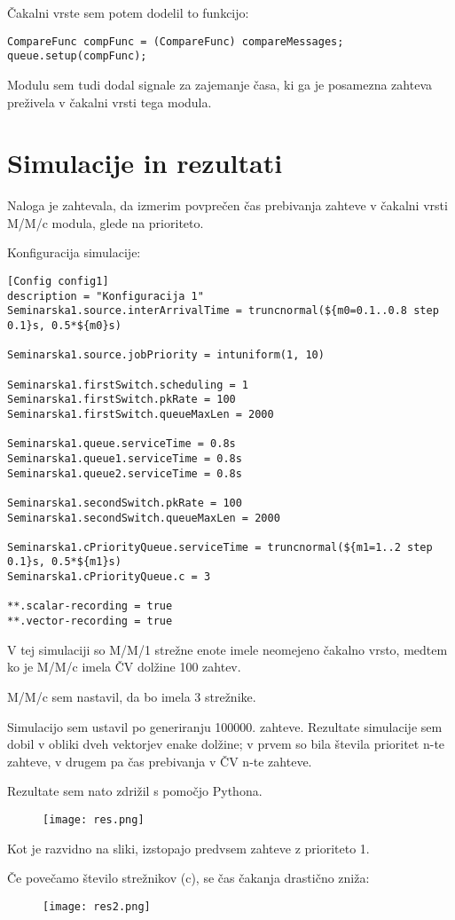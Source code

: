 \documentclass[11pt,a4paper,slovene]{myarticle}
\begin{document}
Čakalni vrste sem potem dodelil to funkcijo:

\begin{lstlisting}
CompareFunc compFunc = (CompareFunc) compareMessages;
queue.setup(compFunc);
\end{lstlisting}

Modulu sem tudi dodal signale za zajemanje časa, ki ga je posamezna zahteva preživela v čakalni vrsti tega modula.


\section{Simulacije in rezultati}
Naloga je zahtevala, da izmerim povprečen čas prebivanja zahteve v čakalni vrsti M/M/c modula, glede na prioriteto.

Konfiguracija simulacije:

\begin{lstlisting}
[Config config1]
description = "Konfiguracija 1"
Seminarska1.source.interArrivalTime = truncnormal(${m0=0.1..0.8 step 0.1}s, 0.5*${m0}s)

Seminarska1.source.jobPriority = intuniform(1, 10)

Seminarska1.firstSwitch.scheduling = 1
Seminarska1.firstSwitch.pkRate = 100
Seminarska1.firstSwitch.queueMaxLen = 2000

Seminarska1.queue.serviceTime = 0.8s
Seminarska1.queue1.serviceTime = 0.8s
Seminarska1.queue2.serviceTime = 0.8s

Seminarska1.secondSwitch.pkRate = 100
Seminarska1.secondSwitch.queueMaxLen = 2000

Seminarska1.cPriorityQueue.serviceTime = truncnormal(${m1=1..2 step 0.1}s, 0.5*${m1}s)
Seminarska1.cPriorityQueue.c = 3

**.scalar-recording = true
**.vector-recording = true
\end{lstlisting}

V tej simulaciji so M/M/1 strežne enote imele neomejeno čakalno vrsto, medtem ko je M/M/c imela ČV dolžine 100 zahtev.

M/M/c sem nastavil, da bo imela 3 strežnike.

Simulacijo sem ustavil po generiranju 100000. zahteve.
Rezultate simulacije sem dobil v obliki dveh vektorjev enake dolžine; v prvem so bila števila prioritet n-te zahteve, v drugem pa čas prebivanja v ČV n-te zahteve.

Rezultate sem nato zdrižil s pomočjo Pythona.

\begin{figure}[h]
  \texttt{[image: res.png]}
\end{figure}

Kot je razvidno na sliki, izstopajo predvsem zahteve z prioriteto 1.

Če povečamo število strežnikov (c), se čas čakanja drastično zniža:
\begin{figure}[h]
  \texttt{[image: res2.png]}
\end{figure}
\end{document}
